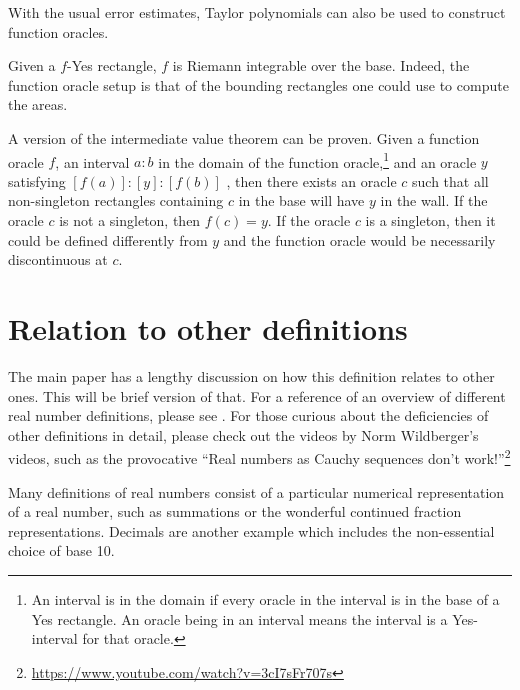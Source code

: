 \documentclass[12pt]{article}
\theoremstyle{remark}
\begin{document}
With the usual error estimates, Taylor polynomials can also be used to construct function oracles. 

Given a $f$-Yes rectangle, $f$ is Riemann integrable over the base. Indeed, the function oracle setup is that of the bounding rectangles one could use to compute the areas. 

A version of the intermediate value theorem can be proven. Given a function oracle $f$, an interval $a:b$ in the domain of the function oracle,\footnote{An interval is in the domain if every oracle in the interval is in the base of a Yes rectangle. An oracle being in an interval means the interval is a Yes-interval for that oracle.} and an oracle $y$ satisfying $[f(a)]:[y]:[f(b)]$ , then there exists an oracle $c$ such that all non-singleton rectangles containing $c$ in the base will have $y$ in the wall. If the oracle $c$ is not a singleton, then $f(c) = y$. If the oracle $c$ is a singleton, then it could be defined differently from $y$ and the function oracle would be necessarily discontinuous at $c$. 


\section{Relation to other definitions}

The main paper has a lengthy discussion on how this definition relates to other ones. This will be brief version of that. For a reference of an overview of different real number definitions, please see \cite{ittay-2015}. For those curious about the deficiencies of other definitions in detail, please check out the videos by Norm Wildberger's videos, such as the provocative ``Real numbers as Cauchy sequences don't work!''\footnote{\url{https://www.youtube.com/watch?v=3cI7sFr707s}} 

Many definitions of real numbers consist of a particular numerical representation of a real number, such as summations or the wonderful continued fraction representations. Decimals are another example which includes the non-essential choice of base 10. 
\end{document}

